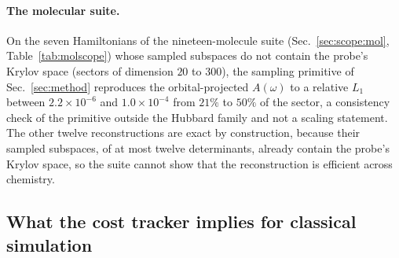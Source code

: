 \paragraph{The molecular suite.} On the seven Hamiltonians of the nineteen-molecule suite (Sec.~\ref{sec:scope:mol}, Table~\ref{tab:molscope}) whose sampled subspaces do not contain the probe's Krylov space (sectors of dimension $20$ to $300$), the sampling primitive of Sec.~\ref{sec:method} reproduces the orbital-projected $A(\omega)$ to a relative $L_1$ between $2.2\times10^{-6}$ and $1.0\times10^{-4}$ from $21\%$ to $50\%$ of the sector, a consistency check of the primitive outside the Hubbard family and not a scaling statement. The other twelve reconstructions are exact by construction, because their sampled subspaces, of at most twelve determinants, already contain the probe's Krylov space, so the suite cannot show that the reconstruction is efficient across chemistry.

\subsection{What the cost tracker implies for classical simulation}
\label{sec:scope:boomerang}

